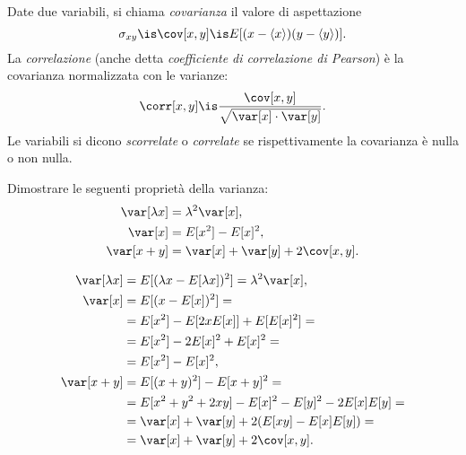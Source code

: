 
\begin{definition}[Covarianza]
	Date due variabili, si chiama \emph{covarianza} il valore di aspettazione
	\begin{equation*}
		\sigma_{xy} \is \cov[x,y] \is E[(x-\langle x\rangle)(y-\langle y\rangle)].
	\end{equation*}
	La \emph{correlazione} (anche detta \emph{coefficiente di correlazione di
    Pearson}) è la covarianza normalizzata con le varianze:
	\begin{equation*}
		\corr[x,y] \is \frac{\cov[x,y]}{\sqrt{\var[x]\cdot\var[y]}}.
	\end{equation*}
	Le variabili si dicono \emph{scorrelate} o \emph{correlate} se rispettivamente la covarianza è nulla o non nulla.
\end{definition}

\begin{exercise}
    Dimostrare le seguenti proprietà della varianza:
	\begin{align*}
		\var[\lambda x] &= \lambda^2 \var[x], \\
		\var[x] &= E[x^2] - E[x]^2, \\
		\var[x+y] &= \var[x] + \var[y] + 2\cov[x,y].
	\end{align*}
\end{exercise}

\begin{solution}
	\begin{align*}
		\var[\lambda x] &= E[(\lambda x - E[\lambda x])^2]
        = \lambda^2 \var[x], \\
		\var[x]
		&= E[(x-E[x])^2] = \\
		&= E[x^2] - E[2xE[x]] + E[E[x]^2] = \\
		&= E[x^2] - 2E[x]^2 + E[x]^2 = \\
		&= E[x^2] - E[x]^2, \\
		\var[x+y]
		&= E[(x+y)^2] - E[x+y]^2 = \\
		&= E[x^2 + y^2 + 2xy] - E[x]^2 - E[y]^2 - 2E[x]E[y] = \\
		&= \var[x] + \var[y] + 2(E[xy] - E[x]E[y]) = \\
		&= \var[x] + \var[y] + 2\cov[x,y]. \\
	\end{align*}
\end{solution}

